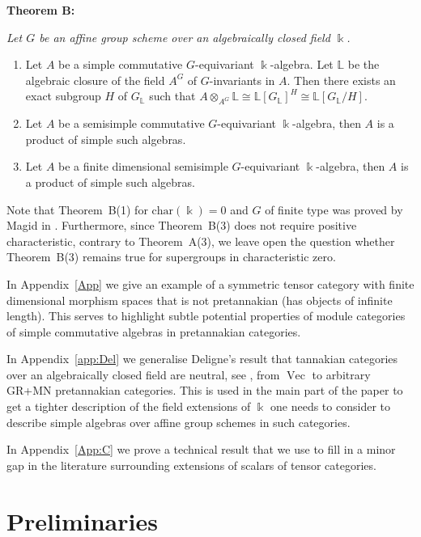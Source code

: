 \documentclass[11pt]{amsart}
\def\bk{\Bbbk}
\def\Vec{\operatorname{Vec}}
\theoremstyle{definition}
\theoremstyle{remark}
\numberwithin{equation}{section}
\begin{document}
\medskip

{\bf Theorem B:} {\em Let $G$ be an affine group scheme over an algebraically closed field $\bk$.
\begin{enumerate}
    \item Let $A$ be a simple commutative $G$-equivariant $\bk$-algebra. Let $\mathbb{L}$ be the algebraic closure of the field $A^G$ of $G$-invariants in $A$. Then there exists an exact subgroup $H$ of $G_{\mathbb{L}}$ such that $A\otimes_{A^G}\mathbb{L}\cong \mathbb{L}[G_{\mathbb{L}}]^H\cong \mathbb{L}[G_{\mathbb{L}}/H]$.
    \item Let $A$ be a semisimple commutative $G$-equivariant $\bk$-algebra, then $A$ is a product of simple such algebras.
    \item Let $A$ be a finite dimensional semisimple $G$-equivariant $\bk$-algebra, then $A$ is a product of simple such algebras.
\end{enumerate}}

\medskip

Note that Theorem~B(1) for $\mathrm{char}(\bk)=0$ and $G$
 of finite type was proved by Magid in \cite{Magid}. Furthermore, since Theorem~B(3) does not require positive characteristic, contrary to Theorem~A(3), we leave open the question whether Theorem~B(3) remains true for supergroups in characteristic zero.




In Appendix~\ref{App} we give an example of a symmetric tensor category with finite dimensional morphism spaces that is not pretannakian (has objects of infinite length). 
This serves to highlight subtle potential properties of module categories of simple commutative algebras in pretannakian categories. 

In Appendix~\ref{app:Del} we generalise Deligne's result that tannakian categories over an algebraically closed field are neutral, see \cite{Del02, Duke}, from $\Vec$ to arbitrary GR+MN pretannakian categories. This is used in the main part of the paper to get a tighter description of the field extensions of $\bk$ one needs to consider to describe simple algebras over affine group schemes in such categories.

In Appendix~\ref{App:C} we prove a technical result that we use to fill in a minor gap in the literature surrounding extensions of scalars of tensor categories.

\section{Preliminaries}\label{sec:prel}
\end{document}
